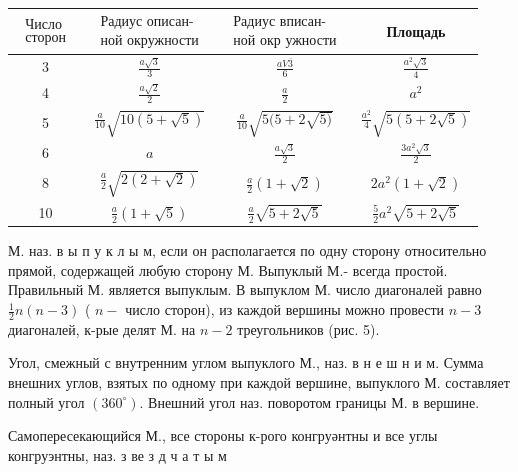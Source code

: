 \documentclass[10pt]{article}
\begin{document}
\begin{center}

\begin{tabular}{c|c|c|c}

\hline

$\begin{array}{c}\text { Число } \\ \text { сторон }\end{array}$ & $\begin{array}{c}\text { Радиус описан- } \\ \text { ной окружности }\end{array}$ & $\begin{array}{c}\text { Радиус вписан- } \\ \text { ной окр ужности }\end{array}$ & Площадь \\

\hline

3 & $\frac{a \sqrt{3}}{3}$ & $\frac{a V \overline{3}}{6}$ & $\frac{a^{2} \sqrt{3}}{4}$ \\

\hline

4 & $\frac{a \sqrt{2}}{2}$ & $\frac{a}{2}$ & $a^{2}$ \\

\hline

5 & $\frac{a}{10} \sqrt{10(5+\sqrt{5})}$ & $\frac{a}{10} \sqrt{5(5+2 \sqrt{5)}}$ & $\frac{a^{2}}{4} \sqrt{5(5+2 \sqrt{5})}$ \\

\hline

6 & $a$ & $\frac{a \sqrt{3}}{2}$ & $\frac{3 a^{2} \sqrt{3}}{2}$ \\

\hline

8 & $\frac{a}{2} \sqrt{2(2+\sqrt{2})}$ & $\frac{a}{2}(1+\sqrt{2})$ & $2 a^{2}(1+\sqrt{2})$ \\

\hline

10 & $\frac{a}{2}(1+\sqrt{5})$ & $\frac{a}{2} \sqrt{5+2 \sqrt{5}}$ & $\frac{5}{2} a^{2} \sqrt{5+2 \sqrt{5}}$ \\

\hline

\end{tabular}

\end{center}



М. наз. в ы п у к л ы м, если он располагается по одну сторону относительно прямой, содержащей любую сторону М. Выпуклый М.- всегда простой. Правильный М. является выпуклым. В выпуклом М. число диагоналей равно $\frac{1}{2} n(n-3)$ ( $n-$ число сторон), из каждой вершины можно провести $n-3$ диагоналей, к-рые делят М. на $n-2$ треугольников (рис. 5).



Угол, смежный с внутренним углом выпуклого М., наз. в н е ш н и м. Сумма внешних углов, взятых по одному при каждой вершине, выпуклого М. составляет полный угол $\left(360^{\circ}\right)$. Внешний угол наз. поворотом границы М. в вершине.



Самопересекающийся М., все стороны к-рого конгруәнтны и все углы конгруэнтны, наз. з ве з д ч а т ы м
\end{document}
